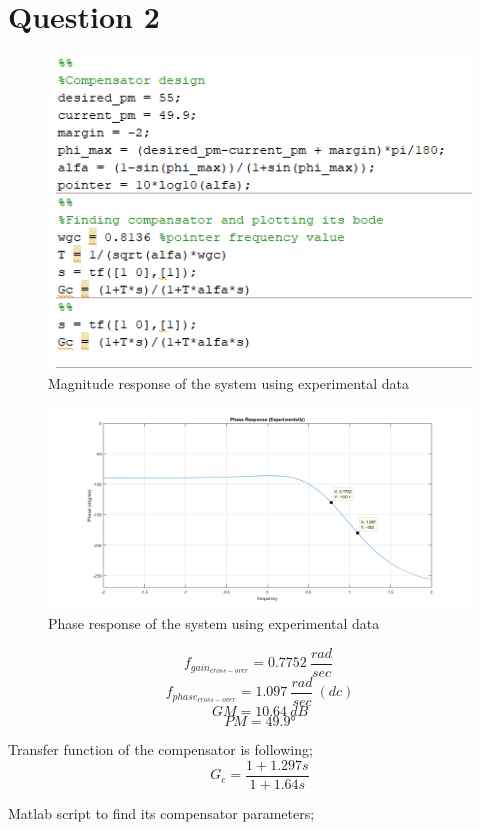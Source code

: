 \documentclass[11pt]{report}
\begin{document}
\section*{Question 2}
\begin{figure}[H]
  \includegraphics[scale=0.40, center]{code}
  \caption{Magnitude response of the system using experimental data}
  \label{fig:zero}
\end{figure}
\begin{figure}[H]
  \includegraphics[scale=0.40, center]{phase_response_exp}
  \caption{Phase response of the system using experimental data}
  \label{fig:zero}
\end{figure}
\[f_{gain_{cross-over}}= 0.7752 \>\frac{rad}{sec} \>\]
\[f_{phase_{cross-over}}= 1.097 \>\frac{rad}{sec} \> (dc)\]
\[GM=10.64 \> dB\]
\[PM=\ang{49.9}\]

Transfer function of the compensator is following;
\[G_c = \frac{1+1.297s}{1+1.64s}\]

Matlab script to find its compensator parameters;
\end{document}
